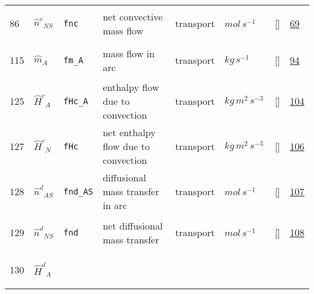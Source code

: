 \begin{longtable}{|p{1cm}|p{3cm}|p{3cm}|p{7cm}|p{3.0cm}|p{3cm}|p{2cm}|p{1cm}|}
    86
             & \hypertarget{"v:86"}{ $ {\hat{n}^{c}}_{{N S}} $}
             & \verb|fnc|
             & net convective mass flow
             & \begin{lay}transport \end{lay}
             & $ mol \,s^{-1} \, $
             & []
             & \hyperlink{"e:69"}{ 69 }
                 \\
    115
             & \hypertarget{"v:115"}{ $ {\hat{m}}_{A} $}
             & \verb|fm_A|
             & mass flow in arc
             & \begin{lay}transport \end{lay}
             & $ kg \,s^{-1} \, $
             & []
             & \hyperlink{"e:94"}{ 94 }
                 \\
    125
             & \hypertarget{"v:125"}{ $ {\hat{H}^{c}}_{A} $}
             & \verb|fHc_A|
             & enthalpy flow due to convection
             & \begin{lay}transport \end{lay}
             & $ kg \,m^{2} \,s^{-3} \, $
             & []
             & \hyperlink{"e:104"}{ 104 }
                 \\
    127
             & \hypertarget{"v:127"}{ $ {\hat{H}^{c}}_{N} $}
             & \verb|fHc|
             & net enthalpy flow due to convection
             & \begin{lay}transport \end{lay}
             & $ kg \,m^{2} \,s^{-3} \, $
             & []
             & \hyperlink{"e:106"}{ 106 }
                 \\
    128
             & \hypertarget{"v:128"}{ $ {\hat{n}^{d}}_{{A S}} $}
             & \verb|fnd_AS|
             & diffusional mass transfer in arc
             & \begin{lay}transport \end{lay}
             & $ mol \,s^{-1} \, $
             & []
             & \hyperlink{"e:107"}{ 107 }
                 \\
    129
             & \hypertarget{"v:129"}{ $ {\hat{n}^{d}}_{{N S}} $}
             & \verb|fnd|
             & net diffusional mass transfer
             & \begin{lay}transport \end{lay}
             & $ mol \,s^{-1} \, $
             & []
             & \hyperlink{"e:108"}{ 108 }
                 \\
    130
             & \hypertarget{"v:130"}{ $ {\hat{H}^{d}}_{A} $}

\end{longtable}
